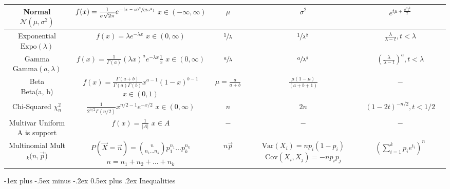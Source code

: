 \documentclass[10pt,landscape]{article}
\makeatletter
\theoremstyle{definition}
\newcommand{\var}{\textrm{Var}}
\newcommand{\cov}{\textrm{Cov}}
\newcommand{\N}{\mathcal{N}}
\newcommand{\Beta}{\textrm{Beta}}
\newcommand{\Gam}{\textrm{Gamma}}
\newcommand{\Expo}{\textrm{Expo}}
\newcommand{\Mult}{\textrm{Mult}}
\renewcommand{\section}{\@startsection{section}{1}{0mm}%
                                {-1ex plus -.5ex minus -.2ex}%
                                {0.5ex plus .2ex}%
                                {\normalfont\large\bfseries}}
\makeatother
\begin{document}
\begin{center}
\begin{tabular}{cccccc}
\hline
\shortstack{Normal \\ $\N(\mu, \sigma^2)$} & \shortstack{$f(x) = \frac{1}{\sigma \sqrt{2\pi}} e^{-\sfrac{(x - \mu)^2}{(2 \sigma^2)}}$ \\ $x \in (-\infty, \infty)$} & $\mu$  & $\sigma^2$ & $e^{t\mu + \frac{\sigma^2t^2}{2}}$\\
\hline
\shortstack{Exponential \\ $\Expo(\lambda)$} & \shortstack{$f(x) = \lambda e^{-\lambda x}$\\$ x \in (0, \infty)$} & $\sfrac{1}{\lambda}$  & $\sfrac{1}{\lambda^2}$ & $\frac{\lambda}{\lambda - t}, t < \lambda$\\
\hline
\shortstack{Gamma \\ $\Gam(a, \lambda)$} & \shortstack{$f(x) = \frac{1}{\Gamma(a)}(\lambda x)^ae^{-\lambda x}\frac{1}{x}$\\$ x \in (0, \infty)$} & $\sfrac{a}{\lambda}$  & $\sfrac{a}{\lambda^2}$ & $\left(\frac{\lambda}{\lambda - t}\right)^a, t < \lambda$\\
\hline
\shortstack{Beta \\ \Beta(a, b)} & \shortstack{$f(x) = \frac{\Gamma(a+b)}{\Gamma(a)\Gamma(b)}x^{a-1}(1-x)^{b-1}$\\$x \in (0, 1) $} & $\mu = \frac{a}{a + b}$  & $\frac{\mu(1-\mu)}{(a + b + 1)}$ & $-$\\
\hline
\shortstack{Chi-Squared \\ $\chi_n^2$} & \shortstack{$\frac{1}{2^{n/2}\Gamma(n/2)}x^{n/2 - 1}e^{-x/2}$\\$x \in (0, \infty) $} & $n$  & $2n$ & $(1 - 2t)^{-n/2}, t < 1/2$\\
\hline
\hline
\shortstack{Multivar Uniform \\ A is support} & \shortstack{$f(x) = \frac{1}{|A|}$\\$  x \in A $} & $-$  & $-$ & $-$\\
\hline
\shortstack{Multinomial \\ \Mult$_k(n, \vec{p}$)} & \shortstack{$P(\vec{X} = \vec{n}) = {n \choose n_1\dots n_k}p_1^{n_1}\dots p_k^{n_k}$ \\ $n = n_1 + n_2 + \dots + n_k$} & $n\vec{p}$ & \shortstack{$\var(X_i) = np_i(1-p_i)$ \\ $\cov(X_i, X_j) = -np_ip_j$} & $\left(\sum_{i=1}^k p_ie^{t_i}\right)^n$ \\
\hline
\hline

\end{tabular}

\hskip 1cm
\section{Inequalities}


\end{center}
\end{document}
